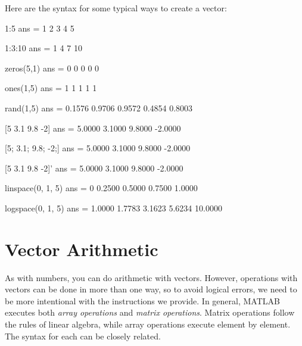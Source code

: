 Here are the syntax for some typical ways to create a vector:
\begin{code}
     1:5
     ans =
          1     2     3     4     5

     1:3:10
     ans =
          1     4     7    10

     zeros(5,1)
     ans =
          0
          0
          0
          0
          0

     ones(1,5)
     ans =
          1     1     1     1     1

     rand(1,5)
     ans =
         0.1576    0.9706    0.9572    0.4854    0.8003

     [5 3.1 9.8 -2]
     ans =
         5.0000    3.1000    9.8000   -2.0000

     [5; 3.1; 9.8; -2;]
     ans =
         5.0000
         3.1000
         9.8000
        -2.0000

     [5 3.1 9.8 -2]'
     ans =
         5.0000
         3.1000
         9.8000
        -2.0000

     linspace(0, 1, 5)
     ans =
            0    0.2500    0.5000    0.7500    1.0000
        
     logspace(0, 1, 5)
     ans =
       1.0000    1.7783    3.1623    5.6234   10.0000
\end{code}


\section{Vector Arithmetic}
\label{elementwise}


As with numbers, you can do arithmetic with vectors.  However, operations with vectors can be done in more than one way, so to avoid logical errors, we need to be more intentional with the instructions we provide.  In general, MATLAB executes both \emph{array operations} and \emph{matrix operations}.   Matrix operations follow the rules of linear algebra, while array operations execute element by element.  The syntax for each can be closely related.



